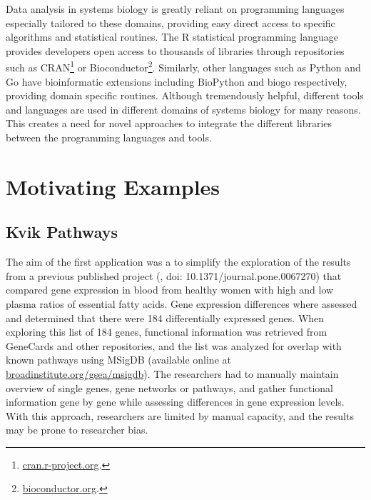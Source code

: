 Data analysis in systems biology is greatly reliant on programming languages
especially tailored to these domains, providing easy direct access to specific
algorithms and statistical routines.  The R statistical programming language
provides developers open access to thousands of libraries through  repositories
such as CRAN\footnote{\url{cran.r-project.org}.} or
Bioconductor\footnote{\url{bioconductor.org}.}.  Similarly, other languages such
as  Python and Go have bioinformatic extensions including
BioPython\cite{biopython} and biogo\cite{biogo}  respectively, providing domain
specific routines.  Although  tremendously helpful, different tools and
languages are used in different domains of systems biology for many reasons.
This creates a need for novel approaches to integrate the different libraries
between the programming languages and tools.



\section{Motivating Examples}

\subsection{Kvik Pathways} 
The aim of the first application was a to simplify the exploration of the
results from a previous published project (\cite{olsen2013plasma}, doi:
10.1371/journal.pone.0067270) that compared gene expression in blood from
healthy women with high and low plasma ratios of essential fatty acids.  Gene
expression differences where assessed and determined that there were 184
differentially expressed genes. When exploring this list of 184 genes,
functional information was retrieved from GeneCards and other repositories, and
the list was analyzed for overlap with known pathways using MSigDB (available
online at
\href{broadinstitute.org/gsea/msigdb}{broadinstitute.org/gsea/msigdb}). The
researchers had to manually maintain overview of single genes, gene networks or
pathways, and gather functional information gene by gene while assessing
differences in gene expression levels.  With this approach, researchers are
limited by manual capacity, and the results may be prone to researcher bias.




